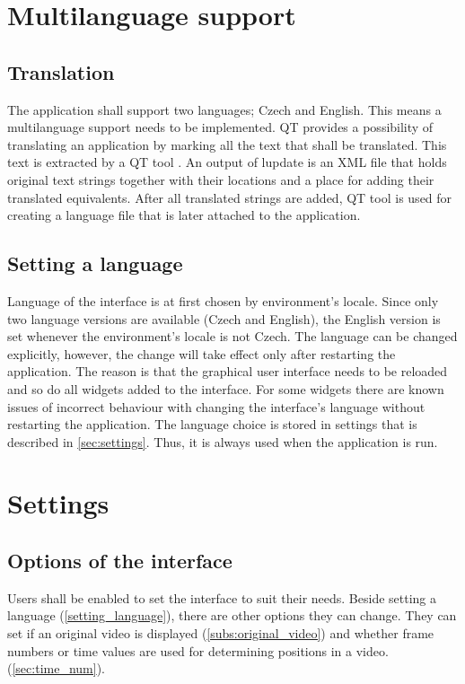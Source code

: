 \section{Multilanguage support}
\subsection{Translation}
The application shall support two languages; Czech and English. This means a multilanguage support needs to be implemented. QT provides a possibility of translating an application by marking all the text that shall be translated. This text is extracted by a QT tool . An output of lupdate is an XML file that holds original text strings together with their locations and a place for adding their translated equivalents. After all translated strings are added, QT tool  is used for creating a language file that is later attached to the application.

\subsection{Setting a language}\label{setting_language}
Language of the interface is at first chosen by environment's locale. Since only two language versions are available (Czech and English), the English version is set whenever the environment's locale is not Czech. The language can be changed explicitly, however, the change will take effect only after restarting the application. The reason is that the graphical user interface needs to be reloaded and so do all widgets added to the interface. For some widgets there are known issues of incorrect behaviour with changing the interface's language without restarting the application. The language choice is stored in settings that is described in \autoref{sec:settings}. Thus, it is always used when the application is run.

\section{Settings}\label{sec:settings}
\subsection{Options of the interface}
Users shall be enabled to set the interface to suit their needs. Beside setting a language (\autoref{setting_language}), there are other options they can change. They can set if an original video is displayed (\autoref{subs:original_video}) and whether frame numbers or time values are used for determining positions in a video. (\autoref{sec:time_num}).

